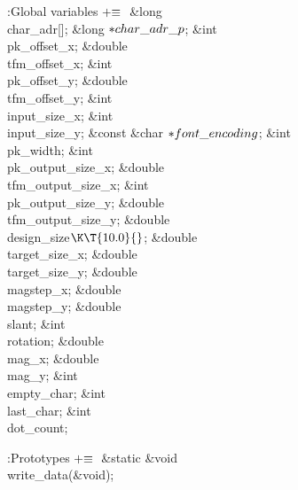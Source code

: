 \Y\B\4:Global variables\X${}\mathrel+\equiv{}$\6
\&{long} \\{char\_adr}[];\6
\&{long} ${}{*}\\{char\_adr\_p}{}$;\7
\&{int} \\{pk\_offset\_x};\6
\&{double} \\{tfm\_offset\_x};\6
\&{int} \\{pk\_offset\_y};\6
\&{double} \\{tfm\_offset\_y};\7
\&{int} \\{input\_size\_x};\6
\&{int} \\{input\_size\_y};\6
\&{const} \&{char} ${}{*}\\{font\_encoding}{}$;\6
\&{int} \\{pk\_width};\6
\&{int} \\{pk\_output\_size\_x};\6
\&{double} \\{tfm\_output\_size\_x};\6
\&{int} \\{pk\_output\_size\_y};\6
\&{double} \\{tfm\_output\_size\_y};\7
\&{double} \\{design\_size}${}\K\T{10.0}{}$;\6
\&{double} \\{target\_size\_x};\6
\&{double} \\{target\_size\_y};\6
\&{double} \\{magstep\_x};\6
\&{double} \\{magstep\_y};\6
\&{double} \\{slant};\6
\&{int} \\{rotation};\7
\&{double} \\{mag\_x};\6
\&{double} \\{mag\_y};\7
\&{int} \\{empty\_char};\6
\&{int} \\{last\_char};\7
\&{int} \\{dot\_count};\par
\fi

\Y\B\4:Prototypes\X${}\mathrel+\equiv{}$\6
\&{static} \&{void} \\{write\_data}(\&{void});\par
\fi

